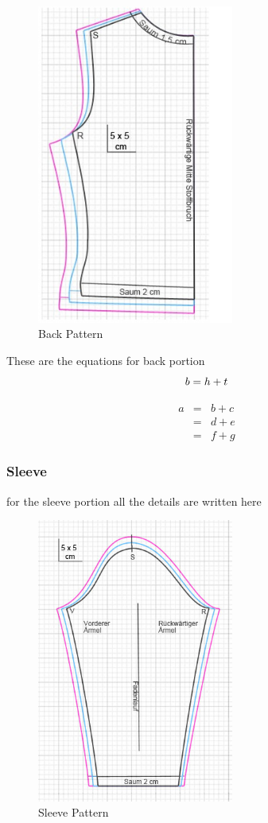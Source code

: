 \documentclass[10pt,letterpaper]{ltugboat}
\begin{document}
\begin{figure}[ht!]
     \centering
     \includegraphics[width=64.54mm]{Back_pattern.jpg}
      \caption{Back Pattern}
      \label{fig:Back}
\end{figure}

These are the equations for back portion
\begin{equation}
 b = h + t\\
\end{equation}


\begin{eqnarray}
a & = & b + c \\
& = & d + e \\
& = & f + g
\end{eqnarray}

\subsubsection{Sleeve}

for the sleeve portion all the details are written here

\begin{figure}[ht!]
     \centering
     \includegraphics[width=64.54mm]{Sleeve.jpg}
      \caption{Sleeve Pattern}
      \label{fig:Sleeve}
\end{figure}
\end{document}
